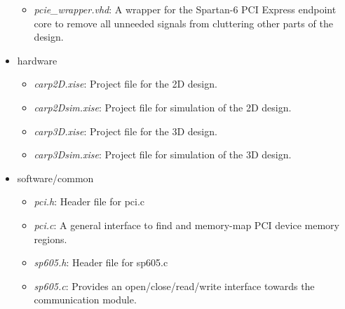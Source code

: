 \begin{itemize}
\begin{itemize}
        \item \emph{pcie\_wrapper.vhd}: A wrapper for the Spartan-6 PCI Express endpoint core to remove all unneeded signals from cluttering other parts of the design.
    \end{itemize}
    \item hardware
    \begin{itemize}
        \item \emph{carp2D.xise}: Project file for the 2D design.
        \item \emph{carp2Dsim.xise}: Project file for simulation of the 2D design.
        \item \emph{carp3D.xise}: Project file for the 3D design.
        \item \emph{carp3Dsim.xise}: Project file for simulation of the 3D design.
    \end{itemize}
    \item software/common
    \begin{itemize}
        \item \emph{pci.h}: Header file for pci.c
        \item \emph{pci.c}: A general interface to find and memory-map PCI device memory regions.
        \item \emph{sp605.h}: Header file for sp605.c
        \item \emph{sp605.c}: Provides an open/close/read/write interface towards the communication module.
    \end{itemize}
\end{itemize}

